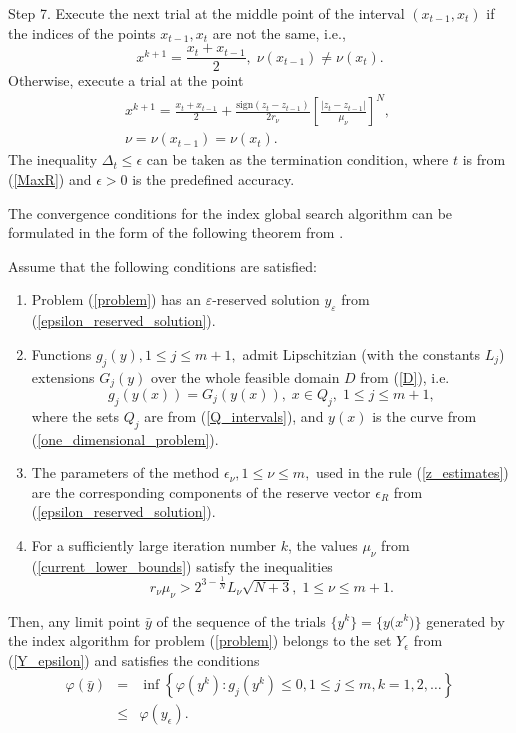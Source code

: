 \documentclass[twocolumn]{svjour3}          %
\begin{document}
Step 7. Execute the next trial at the middle point of the interval $(x_{t-1}, x_t)$ if the indices of the points $x_{t-1}, x_t$ are not the same, i.e.,
$$
	x^{k+1} = \frac{x_t + x_{t-1}}{2}, \; \nu(x_{t-1}) \neq \nu(x_t).
$$
Otherwise, execute a trial at the point
\begin{align*}
	x^{k+1} = \frac{x_t+x_{t-1}}{2} + \frac{\mathrm{sign}(z_t-z_{t-1})}{2r_\nu}\left[\frac{\left|z_t-z_{t-1}\right|}{\mu_\nu}\right]^N, \; \\
	\nu=\nu(x_{t-1})=\nu(x_t).
\end{align*}
The inequality $\Delta_t \leq \epsilon$ can be taken as the termination condition, where $t$ is from (\ref{MaxR}) and $\epsilon>0$ is the predefined accuracy.

	The convergence conditions for the index global search algorithm can be formulated in the form of the following theorem from \cite{Strongin2000}. 
\\
\begin{theorem}\label{theorem:1} Assume that the following conditions are satisfied:
	\begin{enumerate} 
		\item Problem (\ref{problem}) has an $\varepsilon$-reserved solution $y_{\varepsilon}$ from (\ref{epsilon_reserved_solution}).
		\item Functions $g_j(y), 1 \leq j \leq m+1,$ admit Lipschitzian (with the constants $L_j$) extensions $G_{j}(y)$ over the whole feasible domain $D$ from (\ref{D}), i.e.
	$$
		g_j \left( y(x) \right) = G_j \left( y(x) \right), \; x \in Q_j, \; 1 \leq j \leq m+1,
	$$
	where the sets $Q_j$ are from (\ref{Q_intervals}), and $y(x)$ is the curve from (\ref{one_dimensional_problem}).
		\item The parameters of the method $\epsilon_{\nu}, 1 \leq \nu \leq m,$ used in the rule (\ref{z_estimates}) are the corresponding components of the reserve vector $\epsilon_{R}$ from (\ref{epsilon_reserved_solution}).
		\item For a sufficiently large iteration number $k$, the values $\mu_{\nu}$ from (\ref{current_lower_bounds}) satisfy the inequalities
			\begin{equation}\label{theorem_inequalities}
				r_{\nu}\mu_{\nu} > 2^{3-\frac{1}{N}}L_{\nu}\sqrt{N+3}, \; 1 \leq \nu \leq m+1. 
			\end{equation}
	\end{enumerate}
	Then, any limit point $\bar{y}$ of the sequence of the trials $\{y^k\}=\big\{y\big(x^k\big)\big\}$ generated by the index algorithm for problem (\ref{problem}) belongs to the set $Y_{\epsilon}$ from (\ref{Y_epsilon}) and satisfies the conditions
	\begin{eqnarray*}
		\varphi(\bar y) & = &	\inf\left\{\varphi(y^k):g_j(y^k) \leq 0, 1 \leq j \leq m, k = 1,2,\ldots \right\} \\
		& \leq & \varphi(y_{\epsilon}).
	\end{eqnarray*}
\end{theorem}
\end{document}
